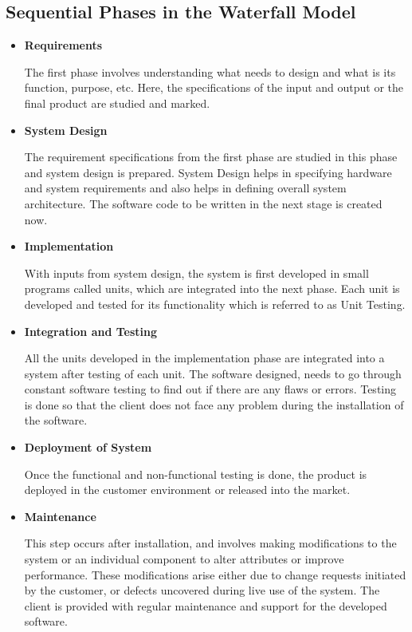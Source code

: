 		\subsection{Sequential Phases in the Waterfall Model}
		\begin{itemize}
			\item
			\textbf{\large Requirements}
			
			The first phase involves understanding what needs to design and what is its function, purpose, etc. Here, the specifications of the input and output or the final product are studied and marked.
			\item
			\textbf{\large System Design}
			
			The requirement specifications from the first phase are studied in this phase and system design is prepared. System Design helps in specifying hardware and system requirements and also helps in defining overall system architecture. The software code to be written in the next stage is created now.
			\item
			\textbf{\large Implementation}
			
			With inputs from system design, the system is first developed in small programs called units, which are integrated into the next phase. Each unit is developed and tested for its functionality which is referred to as Unit Testing.
			\item
			\textbf{\large Integration and Testing}
			
			All the units developed in the implementation phase are integrated into a system after testing of each unit. The software designed, needs to go through constant software testing to find out if there are any flaws or errors. Testing is done so that the client does not face any problem during the installation of the software.
			\item
			\textbf{\large Deployment of System}
			
			Once the functional and non-functional testing is done, the product is deployed in the customer environment or released into the market.
			\item
			\textbf{\large Maintenance}
			
			This step occurs after installation, and involves making modifications to the system or an individual component to alter attributes or improve performance. These modifications arise either due to change requests initiated by the customer, or defects uncovered during live use of the system. The client is provided with regular maintenance and support for the developed software.
		\end{itemize}